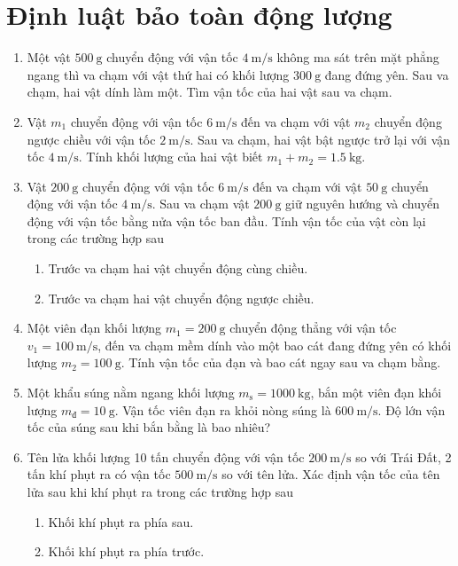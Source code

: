\section{Định luật bảo toàn động lượng}
\begin{enumerate}
	\item %
	Một vật $\SI{500}{\gram}$ chuyển động với vận tốc $\SI{4}{\meter/\second}$ không ma sát trên mặt phẳng ngang thì va chạm với vật thứ hai có khối lượng $\SI{300}{\gram}$ đang đứng yên. Sau va chạm, hai vật dính làm một. Tìm vận tốc của hai vật sau va chạm.
	\item %
	Vật $m_1$ chuyển động với vận tốc $\SI{6}{\meter/\second}$ đến va chạm với vật $m_2$ chuyển động ngược chiều với vận tốc $\SI{2}{\meter/\second}$. Sau va chạm, hai vật bật ngược trở lại với vận tốc $\SI{4}{\meter/\second}$. Tính khối lượng của hai vật biết $m_1+m_2=\SI{ 1,5}{\kilogram}$.
	\item %
	Vật $\SI{200}{\gram}$ chuyển động với vận tốc $\SI{6}{\meter/\second}$ đến va chạm với vật $\SI{50}{\gram}$ chuyển động với vận tốc $\SI{4}{\meter/\second}$. Sau va chạm vật $\SI{200}{\gram}$ giữ nguyên hướng và chuyển động với vận tốc bằng nửa vận tốc ban đầu. Tính vận tốc của vật còn lại trong các trường hợp sau
	\begin{enumerate}[label=\alph*)]
		\item Trước va chạm hai vật chuyển động cùng chiều.
		\item Trước va chạm hai vật chuyển động ngược chiều.
	\end{enumerate}
	\item %
	Một viên đạn khối lượng $m_1=\SI{200}{\gram}$ chuyển động thẳng với vận tốc $v_1=\SI{100}{\meter/\second}$, đến va chạm mềm dính vào một bao cát đang đứng yên có khối lượng $m_2=\SI{100}{\gram}$. Tính vận tốc của đạn và bao cát ngay sau va chạm bằng.
	\item %
	Một khẩu súng nằm ngang khối lượng $m_\text{s}=\SI{1000}{\kilogram}$, bắn một viên đạn khối lượng $m_\text{đ}=\SI{10}{\gram}$. Vận tốc viên đạn ra khỏi nòng súng là $\SI{600}{\meter/\second}$. Độ lớn vận tốc của súng sau khi bắn bằng là bao nhiêu?
	\item %
	Tên lửa khối lượng 10 tấn chuyển động với vận tốc $\SI{200}{\meter/\second}$ so với Trái Đất, 2 tấn khí phụt ra có vận tốc $\SI{500}{\meter/\second}$ so với tên lửa. Xác định vận tốc của tên lửa sau khi khí phụt ra trong các trường hợp sau
	\begin{enumerate}[label=\alph*)]
		\item Khối khí phụt ra phía sau.
		\item Khối khí phụt ra phía trước.
	\end{enumerate}
\end{enumerate}

